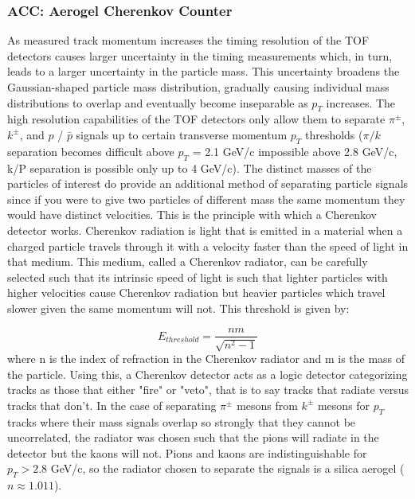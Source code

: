 \subsubsection{ACC: Aerogel Cherenkov Counter}
As measured track momentum increases the timing resolution of the TOF detectors causes larger uncertainty in the timing measurements which, in turn, leads to a larger uncertainty in the particle mass. This uncertainty broadens the Gaussian-shaped particle mass distribution, gradually causing individual mass distributions to overlap and eventually become inseparable as $p_T$ increases. The high resolution capabilities of the TOF detectors only allow them to separate $\pi^{\pm}$, $k^{\pm}$, and $p$ / $\bar{p}$ signals up to certain transverse momentum $p_{T}$ thresholds ($\pi/k$ separation becomes difficult above $p_T$ = 2.1 GeV/c impossible above 2.8 GeV/c, k/P separation is possible only up to 4 GeV/c). The distinct masses of the particles of interest do provide an additional method of separating particle signals since if you were to give two particles of different mass the same momentum they would have distinct velocities. This is the principle with which a Cherenkov detector works. Cherenkov radiation is light that is emitted in a material when a charged particle travels through it with a velocity faster than the speed of light in that medium. This medium, called a Cherenkov radiator, can be carefully selected such that its intrinsic speed of light is such that lighter particles with higher velocities cause Cherenkov radiation but heavier particles which travel slower given the same momentum will not. This threshold is given by:

\begin{equation}
E_{threshold} = \frac{nm}{\sqrt{n^2-1}}
\end{equation}
where n is the index of refraction in the Cherenkov radiator and m is the mass of the particle.
Using this, a Cherenkov detector acts as a logic detector categorizing tracks as those that either "fire" or "veto", that is to say tracks that radiate versus tracks that don't. In the case of separating $\pi^{\pm}$ mesons from $k^{\pm}$ mesons for $p_{T}$ tracks where their mass signals overlap so strongly that they cannot be uncorrelated, the radiator was chosen such that the pions will radiate in the detector but the kaons will not. Pions and kaons are indistinguishable for $p_{T} > 2.8$ GeV/c, so the radiator chosen to separate the signals is a silica aerogel ($n \approx 1.011$).

